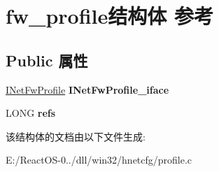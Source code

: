 \hypertarget{structfw__profile}{}\section{fw\+\_\+profile结构体 参考}
\label{structfw__profile}
\subsection*{Public 属性}
\begin{DoxyCompactItemize}
\item 
\mbox{\label{structfw__profile_ade64d73fed00bc9677b324fb5b4ebe55}} 
\hyperlink{interface_i_net_fw_profile}{I\+Net\+Fw\+Profile} {\bfseries I\+Net\+Fw\+Profile\+\_\+iface}
\item 
\mbox{\label{structfw__profile_a36c9f95d6f48539029b58a7f03de24da}} 
L\+O\+NG {\bfseries refs}
\end{DoxyCompactItemize}


该结构体的文档由以下文件生成\+:\begin{DoxyCompactItemize}
\item 
E\+:/\+React\+O\+S-\/0../dll/win32/hnetcfg/profile.\+c\end{DoxyCompactItemize}
